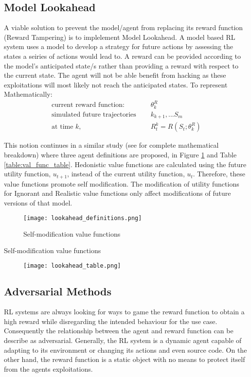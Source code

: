 \subsection{Model Lookahead}
A viable solution to prevent the model/agent from replacing its reward function (Reward Tampering) is to implelement Model Lookahead.
A model based RL system uses a model to develop a strategy for future actions by assessing the states a seiries of actions would lead to.
A reward can be provided according to the model's anticipated state/s rather than providing a reward with respect to the current state.
The agent will not be able benefit from hacking as these exploitations will most likely not reach the anticipated states.
To represent Mathematically:
\begin{align*}
    \text{current reward function: } &\quad\theta^R_k \\
    \text{simulated future trajectories } &\quad  k_{k+1},... S_m  \\
    \text{at time } k, &\quad  R_t^k = R(S_t;\theta^R_k)
\end{align*}
    
This notion continues in a similar study (see for complete mathematical breakdown) \cite{EverittFDH16} where three agent definitions are proposed, in Figure \ref{fig:value_func} and Table \ref{table:val_func_table}.
Hedonistic value functions are calculated using the future utility function, $u_{t+1}$, instead of the current utility function, $u_t$.
Therefore, these value functions promote self modification.
The modification of utility functions for Ignorant and Realistic value functions only affect modifications of future versions of that model.

\begin{figure}[H]
    \centering
    \caption{Self-modification value functions \cite{EverittFDH16}}
    \texttt{[image: lookahead\_definitions.png]}
    \label{fig:value_func}
\end{figure}

\begin{table}[h]
    \bigskip
    \caption{Self-modification value functions \cite{EverittFDH16}}
    \begin{figure}[H]
        \centering
        \texttt{[image: lookahead\_table.png]}
    \end{figure}
    \label{table:val_func_table}
\end{table}

\subsection{Adversarial Methods}
RL systems are always looking for ways to game the reward function to obtain a high reward while disregarding the intended behaviour for the use case.
Consequently the relationship between the agent and reward function can be describe as adversarial.
Generally, the RL system is a dynamic agent capable of adapting to its environment or changing its actions and even source code. 
On the other hand, the reward function is a static object with no means to protect itself from the agents exploitations.

